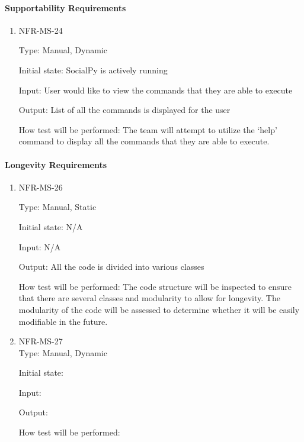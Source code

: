 \documentclass[12pt, titlepage]{article}
\begin{document}
 \paragraph{Supportability Requirements}
\begin{enumerate}
    \item{NFR-MS-24\\}
    
    Type: Manual, Dynamic
    
    Initial state: SocialPy is actively running
    
    Input: User would like to view the commands that they are able to execute
    
    Output: List of all the commands is displayed for the user
    
    How test will be performed: The team will attempt to utilize the `help' command to display all the commands that they are able to execute.

 \end{enumerate} 
 
 \paragraph{Longevity Requirements}
\begin{enumerate}
    \item{NFR-MS-26\\}
    
    Type: Manual, Static
    
    Initial state: N/A
    
    Input: N/A
    
    Output: All the code is divided into various classes
    
    How test will be performed: The code structure will be inspected to ensure that there are several classes and modularity to allow for longevity. The modularity of the code will be assessed to determine whether it will be easily modifiable in the future.
    
    \item{NFR-MS-27\\}
    Type: Manual, Dynamic
    
    Initial state:
    
    Input:
    
    Output:
    
    How test will be performed:
    
 \end{enumerate} 
 
\end{document}

